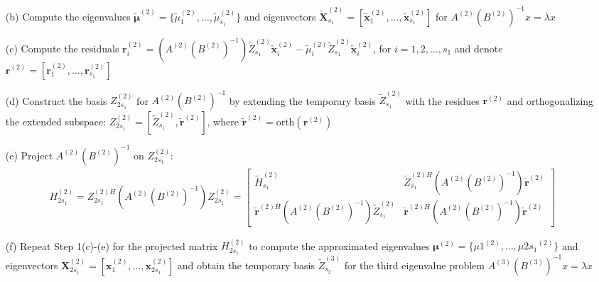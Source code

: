 \begin{algorithm}[H]
\begin{algorithmic}[1]
\begin{itemize}
            \item[(b)] Compute the eigenvalues $\tilde{\boldsymbol{\mu}}^{(2)} = \{\tilde{\mu}_{1}^{(2)}, \dots, \tilde{\mu}_{s_{1}}^{(2)}\}$ and eigenvectors $\tilde{\boldsymbol{X}}_{s_{1}}^{(2)} = \left[\tilde{\boldsymbol{x}}_{1}^{(2)}, \dots, \tilde{\boldsymbol{x}}_{s_{1}}^{(2)}\right]$ for $A^{(2)}\left(B^{(2)}\right)^{-1}x = \lambda x$
            
            
            \item[(c)] Compute the residuals $\boldsymbol{r}_{i}^{(2)} = \left(A^{(2)}\left(B^{(2)}\right)^{-1}\right)\tilde{Z}_{s_{1}}^{(2)}\tilde{\boldsymbol{x}}_{i}^{(2)} - \tilde{\mu}_{i}^{(2)}\tilde{Z}_{s_{1}}^{(2)}\tilde{\boldsymbol{x}}_{i}^{(2)}$, for $i = 1, 2, \dots, s_{1}$ and denote $\boldsymbol{r}^{(2)} = \left[\boldsymbol{r}_{1}^{(2)}, \dots, \boldsymbol{r}_{s_{1}}^{(2)}\right]$
            
            \item[(d)] Construct the basis $Z_{2s_{1}}^{(2)}$ for $A^{(2)}\left(B^{(2)}\right)^{-1}$ by extending the temporary basis $\tilde{Z}_{s_{1}}^{(2)}$ with the residues $\boldsymbol{r}^{(2)}$ and orthogonalizing the extended subspace: $Z_{2s_{1}}^{(2)} = \left[\tilde{Z}_{s_{1}}^{(2)}, \tilde{\boldsymbol{r}}^{(2)}\right]$, where $\tilde{\boldsymbol{r}}^{(2)} = \text{orth}\left(\boldsymbol{r}^{(2)}\right)$
            
            \item[(e)] Project $A^{(2)}\left(B^{(2)}\right)^{-1}$ on $Z_{2s_{1}}^{(2)}$: 
            \begin{align*}
                H_{2s_{1}}^{(2)} = Z_{2s_{1}}^{(2)H}\left(A^{(2)}\left(B^{(2)}\right)^{-1}\right) Z_{2s_{1}}^{(2)} = \begin{bmatrix}
                 \tilde{H}_{s_{1}}^{(2)} & \tilde{Z}_{s_{1}}^{(2)H}\left(A^{(2)}\left(B^{(2)}\right)^{-1}\right) \tilde{\boldsymbol{r}}^{(2)}\\
                 \tilde{\boldsymbol{r}}^{(2)H}\left(A^{(2)}\left(B^{(2)}\right)^{-1}\right) \tilde{Z}_{s_{1}}^{(2)} & \tilde{\boldsymbol{r}}^{(2)H}\left(A^{(2)}\left(B^{(2)}\right)^{-1}\right) \tilde{\boldsymbol{r}}^{(2)}
                \end{bmatrix}
            \end{align*}
            \item[(f)] Repeat Step 1(c)-(e) for the projected matrix $ H_{2s_{1}}^{(2)}$ to compute the approximated eigenvalues $\boldsymbol{\mu}^{(2)} = \{\mu{1}^{(2)}, \dots, \mu{2s_{1}}^{(2)}\}$  and eigenvectors $\boldsymbol{X}_{2s_{1}}^{(2)} = \left[\boldsymbol{x}_{1}^{(2)}, \dots, \boldsymbol{x}_{2s_{1}}^{(2)}\right]$ and obtain the temporary basis $\tilde{Z}_{s_{2}}^{(3)}$ for the third eigenvalue problem $A^{(3)}\left(B^{(3)}\right)^{-1}x = \lambda x$
        \end{itemize}
        

\end{algorithmic}
\end{algorithm}
